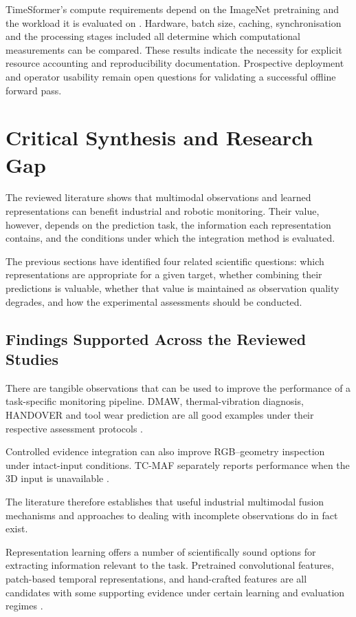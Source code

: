 TimeSformer's compute requirements depend on the ImageNet pretraining and the workload it is
evaluated on \parencite{P034}.
Hardware, batch size, caching, synchronisation and the processing stages included all determine
which computational measurements can be compared.
These results indicate the necessity for explicit resource accounting and reproducibility
documentation. Prospective deployment and operator usability remain open questions for validating a
successful offline forward pass.

\section{Critical Synthesis and Research Gap}

The reviewed literature shows that multimodal observations and learned representations can benefit
industrial and robotic monitoring. Their value, however, depends on the prediction task, the
information each representation contains, and the conditions under which the integration method is
evaluated.

The previous sections have identified four related scientific questions: which representations are
appropriate for a given target, whether combining their predictions is valuable, whether that value
is maintained as observation quality degrades, and how the experimental assessments should be
conducted.

\subsection{Findings Supported Across the Reviewed Studies}

There are tangible observations that can be used to improve the performance of a task-specific
monitoring pipeline. DMAW, thermal-vibration diagnosis, HANDOVER and tool wear prediction are all
good examples under their respective assessment protocols
\parencite{P003,Huo2022Multisensor,Thoduka2024Handover,P045}.

Controlled evidence integration can also improve RGB--geometry inspection under intact-input
conditions. TC-MAF separately reports performance when the 3D input is unavailable \parencite{P026}.

The literature therefore establishes that useful industrial multimodal fusion mechanisms and
approaches to dealing with incomplete observations do in fact exist.

Representation learning offers a number of scientifically sound options for extracting information
relevant to the task. Pretrained convolutional features, patch-based temporal representations, and
hand-crafted features are all candidates with some supporting evidence under certain learning and
evaluation regimes \parencite{Roth2022Towards,Nie2023PatchTST,Horwitz2023Back}.

